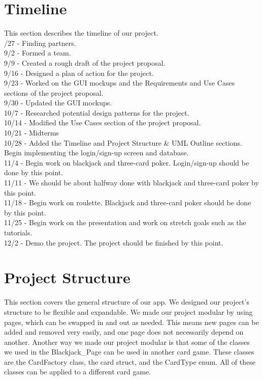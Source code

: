 \documentclass[10pt,conference,onecolumn,compsoc]{IEEEtran}
\begin{document}
\newpage

\section{Timeline}
\noindent
This section describes the timeline of our project.\\
/27 - Finding partners.\\
9/2 - Formed a team.\\
9/9 - Created a rough draft of the project proposal.\\
9/16 - Designed a plan of action for the project.\\
9/23 - Worked on the GUI mockups and the Requirements and Use Cases sections of the project proposal.\\
9/30 - Updated the GUI mockups.\\
10/7 - Researched potential design patterns for the project.\\
10/14 - Modified the Use Cases section of the project proposal.\\
10/21 - Midterms\\
10/28 - Added the Timeline and Project Structure \& UML Outline sections. Begin implementing the login/sign-up screen and database.\\
11/4 - Begin work on blackjack and three-card poker. Login/sign-up should be done by this point.\\
11/11 - We should be about halfway done with blackjack and three-card poker by this point.\\
11/18 - Begin work on roulette. Blackjack and three-card poker should be done by this point.\\
11/25 - Begin work on the presentation and work on stretch goals such as the tutorials.\\
12/2 - Demo the project. The project should be finished by this point.\\

\section{Project Structure}
\noindent
This section covers the general structure of our app. We designed our project's structure to be flexible and expandable. We made our project modular by using pages, which can be swapped in and out as needed. This means new pages can be added and removed very easily, and one page does not necessarily depend on another. Another way we made our project modular is that some of the classes we used in the Blackjack\_Page can be used in another card game. These classes are the CardFactory class, the card struct, and the CardType enum. All of these classes can be applied to a different card game.
\end{document}
